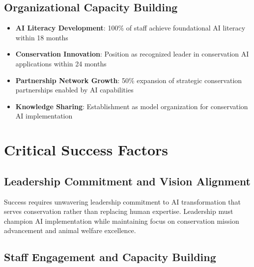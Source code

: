\documentclass[
  Letterpaper,
]{scrbook}
\providecommand{\tightlist}{%
  \setlength{\itemsep}{0pt}\setlength{\parskip}{0pt}}
\begin{document}
\subsection*{Organizational Capacity
Building}\label{organizational-capacity-building}

\begin{itemize}
\tightlist
\item
  \textbf{AI Literacy Development}: 100\% of staff achieve foundational
  AI literacy within 18 months
\item
  \textbf{Conservation Innovation}: Position as recognized leader in
  conservation AI applications within 24 months
\item
  \textbf{Partnership Network Growth}: 50\% expansion of strategic
  conservation partnerships enabled by AI capabilities
\item
  \textbf{Knowledge Sharing}: Establishment as model organization for
  conservation AI implementation
\end{itemize}

\section*{Critical Success Factors}\label{critical-success-factors}


\subsection*{Leadership Commitment and Vision
Alignment}\label{leadership-commitment-and-vision-alignment}

Success requires unwavering leadership commitment to AI transformation
that serves conservation rather than replacing human expertise.
Leadership must champion AI implementation while maintaining focus on
conservation mission advancement and animal welfare excellence.

\subsection*{Staff Engagement and Capacity
Building}\label{staff-engagement-and-capacity-building}
\end{document}
